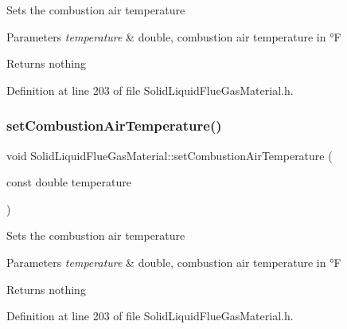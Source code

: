 Sets the combustion air temperature 
\begin{DoxyParams}{Parameters}
{\em temperature} & double, combustion air temperature in °F \\
\hline
\end{DoxyParams}
\begin{DoxyReturn}{Returns}
nothing 
\end{DoxyReturn}


Definition at line 203 of file Solid\+Liquid\+Flue\+Gas\+Material.\+h.

\mbox{\label{class_solid_liquid_flue_gas_material_a626dfbc9ba87abff99e5c5a8204d69c6}} 
\subsubsection{\texorpdfstring{set\+Combustion\+Air\+Temperature()}{setCombustionAirTemperature()}\hspace{0.1cm}{\footnotesize\ttfamily [2/3]}}
{\footnotesize\ttfamily void Solid\+Liquid\+Flue\+Gas\+Material\+::set\+Combustion\+Air\+Temperature (\begin{DoxyParamCaption}\item[{const double}]{temperature }\end{DoxyParamCaption})\hspace{0.3cm}{\ttfamily [inline]}}

Sets the combustion air temperature 
\begin{DoxyParams}{Parameters}
{\em temperature} & double, combustion air temperature in °F \\
\hline
\end{DoxyParams}
\begin{DoxyReturn}{Returns}
nothing 
\end{DoxyReturn}


Definition at line 203 of file Solid\+Liquid\+Flue\+Gas\+Material.\+h.

\mbox{\label{class_solid_liquid_flue_gas_material_a626dfbc9ba87abff99e5c5a8204d69c6}} 
